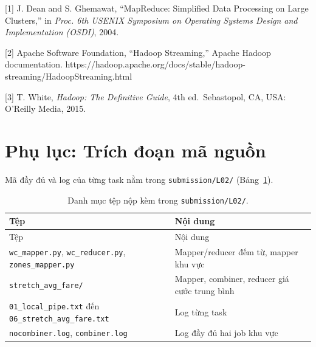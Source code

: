 \documentclass[
  12pt,
  a4paper,
]{report}
\begin{document}
{[}1{]} J. Dean and S. Ghemawat, ``MapReduce: Simplified Data Processing
on Large Clusters,'' in \emph{Proc. 6th USENIX Symposium on Operating
Systems Design and Implementation (OSDI)}, 2004.

{[}2{]} Apache Software Foundation, ``Hadoop Streaming,'' Apache Hadoop
documentation.
https://hadoop.apache.org/docs/stable/hadoop-streaming/HadoopStreaming.html

{[}3{]} T. White, \emph{Hadoop: The Definitive Guide}, 4th
ed.~Sebastopol, CA, USA: O'Reilly Media, 2015.

\section*{Phụ lục: Trích đoạn mã
nguồn}\label{phux1ee5-lux1ee5c-truxedch-ux111oux1ea1n-muxe3-nguux1ed3n}

Mã đầy đủ và log của từng task nằm trong \texttt{submission/L02/}
(Bảng~\ref{tbl:l02-files}).

\begin{longtable}[]{@{}
  >{\raggedright\arraybackslash}p{}
  >{\raggedright\arraybackslash}p{}@{}}
\caption{\label{tbl:l02-files}Danh mục tệp nộp kèm trong
\texttt{submission/L02/}.}\tabularnewline
\toprule\noalign{}
\begin{minipage}[b]{\linewidth}\raggedright
Tệp
\end{minipage} & \begin{minipage}[b]{\linewidth}\raggedright
Nội dung
\end{minipage} \\
\midrule\noalign{}
\endfirsthead
\toprule\noalign{}
\begin{minipage}[b]{\linewidth}\raggedright
Tệp
\end{minipage} & \begin{minipage}[b]{\linewidth}\raggedright
Nội dung
\end{minipage} \\
\midrule\noalign{}
\endhead
\bottomrule\noalign{}
\endlastfoot
\texttt{wc\_mapper.py}, \texttt{wc\_reducer.py},
\texttt{zones\_mapper.py} & Mapper/reducer đếm từ, mapper khu vực \\
\texttt{stretch\_}\allowbreak{}\texttt{avg\_}\allowbreak{}\texttt{fare/}\allowbreak{}
& Mapper, combiner, reducer giá cước trung bình \\
\texttt{01\_}\allowbreak{}\texttt{local\_}\allowbreak{}\texttt{pipe.}\allowbreak{}\texttt{txt}\allowbreak{}
đến
\texttt{06\_}\allowbreak{}\texttt{stretch\_}\allowbreak{}\texttt{avg\_}\allowbreak{}\texttt{fare.}\allowbreak{}\texttt{txt}\allowbreak{}
& Log từng task \\
\texttt{nocombiner.log}, \texttt{combiner.log} & Log đầy đủ hai job khu
vực \\
\end{longtable}
\end{document}
